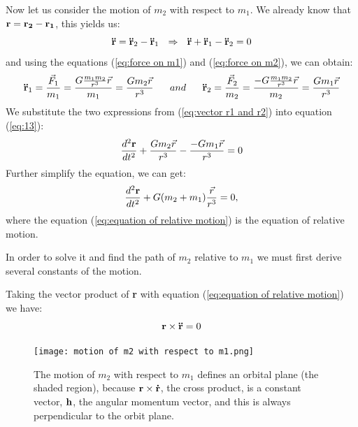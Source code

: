 Now let us consider the motion of $m_{2}$ with respect to $m_{1}$. We already know that ${\bf{r} = {\bf{r_2}}} - {\bf{r_1}}$, this yields us:
\begin{equation}
    {\bf{\ddot{r}}} = {\bf{\ddot{r}}}_{2} - {\bf{\ddot{r}}}_{1} ~~ \Rightarrow{} ~~ {\bf{\ddot{r}}} + {\bf{\ddot{r}}}_{1} - {\bf{\ddot{r}}}_{2} = 0
    \label{eq:13}
\end{equation}
and using the equations (\ref{eq:force on m1}) and (\ref{eq:force on m2}), we can obtain:
\begin{equation}
    {\bf{\ddot{r}}}_1 = \frac{\vec{F}_{1}}{m_1} = \frac{G\frac{m_{1}m_{2}}{r^3}\vec{r}}{m_1} = \frac{Gm_{2}\vec{r}}{r^3} ~~~~~ and ~~~~~ {\bf{\ddot{r}}}_2 = \frac{\vec{F}_{2}}{m_2} = \frac{-G\frac{m_{1}m_{2}}{r^3}\vec{r}}{m_2} = \frac{Gm_{1}\vec{r}}{r^3}
    \label{eq:vector r1 and r2}
\end{equation}
We substitute the two expressions from (\ref{eq:vector r1 and r2}) into equation (\ref{eq:13}):
\begin{equation}
    \frac{{d^2}{\bf{r}}}{dt^2} + \frac{Gm_{2}\vec{r}}{r^3} - \frac{-Gm_{1}\vec{r}}{r^3} = 0
\end{equation}
Further simplify the equation, we can get:
\begin{equation}
    \frac{{d^2}{\bf{r}}}{dt^2} + G(m_{2}+m_{1})\frac{\vec{r}}{r^3} = 0,
    \label{eq:equation of relative motion}
\end{equation}
where the equation (\ref{eq:equation of relative motion}) is the equation of relative motion.

In order to solve it and find the path of $m_2$ relative to $m_1$ we must first derive several constants of the motion.

Taking the vector product of {\bf r} with equation (\ref{eq:equation of relative motion}) we have:
\begin{equation}
    {\bf r} \times {\bf{\ddot{r}}} = 0
    \label{eq:17}
\end{equation}

\begin{figure}
    \centering
    \texttt{[image: motion of m2 with respect to m1.png]}
    \caption{The motion of $m_2$ with respect to $m_1$ defines an orbital plane (the shaded region), because ${\bf r}\times{\bf{\dot{r}}}$, the cross product, is a constant vector, ${\bf h}$, the angular momentum vector, and this is always perpendicular to the orbit plane.}
    \label{fig:motion of m2 with respect to m1}
\end{figure}

